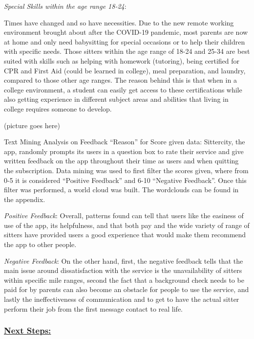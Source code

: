 \documentclass[12pt]{article}
\begin{document}
\emph{Special Skills within the age range 18-24}:

Times have changed and so have necessities. Due to the new remote
working environment brought about after the COVID-19 pandemic, most
parents are now at home and only need babysitting for special occasions
or to help their children with specific needs. Those sitters within the
age range of 18-24 and 25-34 are best suited with skills such as helping
with homework (tutoring), being certified for CPR and First Aid (could
be learned in college), meal preparation, and laundry, compared to those
other age ranges. The reason behind this is that when in a college
environment, a student can easily get access to these certifications
while also getting experience in different subject areas and abilities
that living in college requires someone to develop.

(picture goes here)

Text Mining Analysis on Feedback ``Reason'' for Score given data:
Sittercity, the app, randomly prompts its users in a question box to
rate their service and give written feedback on the app throughout their
time as users and when quitting the subscription. Data mining was used
to first filter the scores given, where from 0-5 it is considered
``Positive Feedback'' and 6-10 ``Negative Feedback''. Once this filter
was performed, a world cloud was built. The wordclouds can be found in
the appendix.

\emph{Positive Feedback}: Overall, patterns found can tell that users
like the easiness of use of the app, its helpfulness, and that both pay
and the wide variety of range of sitters have provided users a good
experience that would make them recommend the app to other people.

\emph{Negative Feedback}: On the other hand, first, the negative
feedback tells that the main issue around dissatisfaction with the
service is the unavailability of sitters within specific mile ranges,
second the fact that a background check needs to be paid for by parents
can also become an obstacle for people to use the service, and lastly
the ineffectiveness of communication and to get to have the actual
sitter perform their job from the first message contact to real life.

\hypertarget{next-steps}{%
\subsubsection{\texorpdfstring{\uline{\textbf{Next
Steps:}}}{Next Steps:}}\label{next-steps}}
\end{document}
